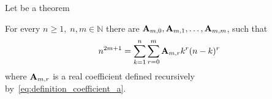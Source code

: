 Let be a theorem
\begin{thm}
    For every $n\geq 1, \; n,m\in\mathbb{N}$ there are ${\mathbf{A}} \sb{m,0}, {\mathbf{A}} \sb{m,1},\dots,{\mathbf{A}} \sb{m,m}$,
    such that
    \begin{equation*}
        n^{2m+1} = \sum_{k=1}^{n}\sum_{r=0}^{m} {\mathbf{A}} \sb{m,r} k^r (n-k)^r
        \label{eq:odd-power-theorem}
    \end{equation*}
    where ${\mathbf{A}} \sb{m,r}$ is a real coefficient defined recursively by~\eqref{eq:definition_coefficient_a}.
\end{thm}
